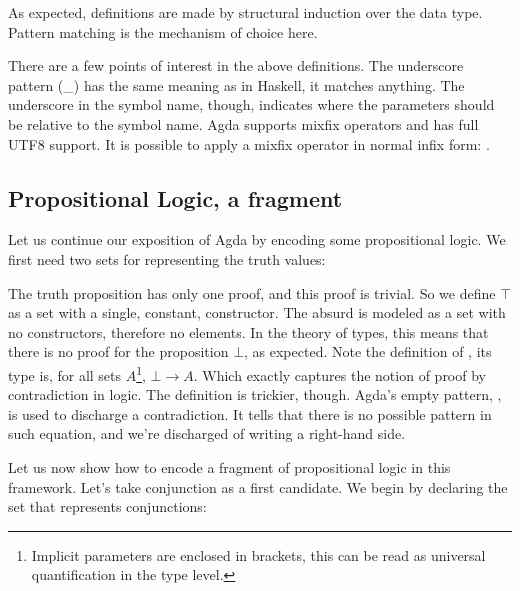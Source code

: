 As expected, definitions are made by structural induction over the
data type. Pattern matching is the mechanism of choice here.


There are a few points of interest in the above definitions. The underscore pattern
(\_) has the same meaning as in Haskell, it matches anything. The underscore in
the symbol name, though, indicates where the parameters should be relative to the symbol name. 
Agda supports mixfix operators and has full UTF8 support. It is possible to
apply a mixfix operator in normal infix form: .

\subsection{Propositional Logic, a fragment}

Let us continue our exposition of Agda by encoding some propositional logic. 
We first need two sets for representing the truth values:


The truth proposition has only one proof, and this proof is trivial. So we define $\top$ as a set
with a single, constant, constructor. The absurd is modeled as a set with no constructors, therefore no elements. In the theory of types,
this means that there is no proof for the proposition $\bot$, as expected. Note the definition
of , its type is, for all sets $A$\footnote{
Implicit parameters are enclosed in brackets, this can be read as universal quantification in
the type level.
}, $\bot \rightarrow A$. Which exactly captures
the notion of proof by contradiction in logic. The definition is trickier, though.
Agda's empty pattern, \inlagda{()}, is used to discharge a contradiction. It tells
that there is no possible pattern in such equation, and we're discharged of writing
a right-hand side.



Let us now show how to encode a fragment of propositional logic in this framework. Let's take
conjunction as a first candidate. We begin by declaring the set that represents conjunctions:

